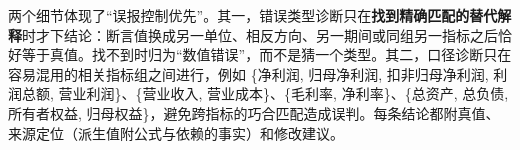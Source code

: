 两个细节体现了“误报控制优先”。其一，错误类型诊断只在\textbf{找到精确匹配的替代解释}时才下结论：断言值换成另一单位、相反方向、另一期间或同组另一指标之后恰好等于真值。找不到时归为“数值错误”，而不是猜一个类型。其二，口径诊断只在容易混用的相关指标组之间进行，例如 \{净利润, 归母净利润, 扣非归母净利润, 利润总额, 营业利润\}、\{营业收入, 营业成本\}、\{毛利率, 净利率\}、\{总资产, 总负债, 所有者权益, 归母权益\}，避免跨指标的巧合匹配造成误判。每条结论都附真值、来源定位（派生值附公式与依赖的事实）和修改建议。
